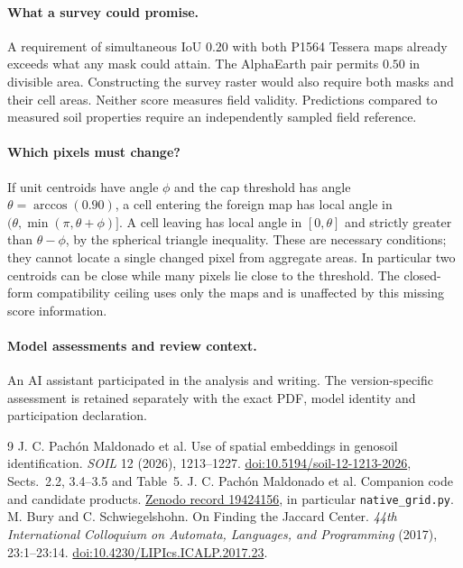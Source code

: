 \documentclass[11pt]{article}
\begin{document}
\paragraph{What a survey could promise.} A requirement of simultaneous IoU $0.20$ with both P1564 Tessera maps already exceeds what any mask could attain. The AlphaEarth pair permits $0.50$ in divisible area. Constructing the survey raster would also require both masks and their cell areas. Neither score measures field validity. Predictions compared to measured soil properties require an independently sampled field reference.

\paragraph{Which pixels must change?} If unit centroids have angle $\phi$ and the cap threshold has angle $\theta=\arccos(0.90)$, a cell entering the foreign map has local angle in $(\theta,\min(\pi,\theta+\phi)]$. A cell leaving has local angle in $[0,\theta]$ and strictly greater than $\theta-\phi$, by the spherical triangle inequality. These are necessary conditions; they cannot locate a single changed pixel from aggregate areas. In particular two centroids can be close while many pixels lie close to the threshold. The closed-form compatibility ceiling uses only the maps and is unaffected by this missing score information.

\paragraph{Model assessments and review context.} An AI assistant participated in the analysis and writing. The version-specific assessment is retained separately with the exact PDF, model identity and participation declaration.

\begin{thebibliography}{9}
 J. C. Pach\'on Maldonado et al. Use of spatial embeddings in genosoil identification. \emph{SOIL} 12 (2026), 1213--1227. \href{https://doi.org/10.5194/soil-12-1213-2026}{doi:10.5194/soil-12-1213-2026}, Sects.~2.2, 3.4--3.5 and Table~5.
 J. C. Pach\'on Maldonado et al. Companion code and candidate products. \href{https://doi.org/10.5281/zenodo.19424156}{Zenodo record 19424156}, in particular \texttt{native\_grid.py}.
 M. Bury and C. Schwiegelshohn. On Finding the Jaccard Center. \emph{44th International Colloquium on Automata, Languages, and Programming} (2017), 23:1--23:14. \href{https://doi.org/10.4230/LIPIcs.ICALP.2017.23}{doi:10.4230/LIPIcs.ICALP.2017.23}.
\end{thebibliography}
\end{document}
